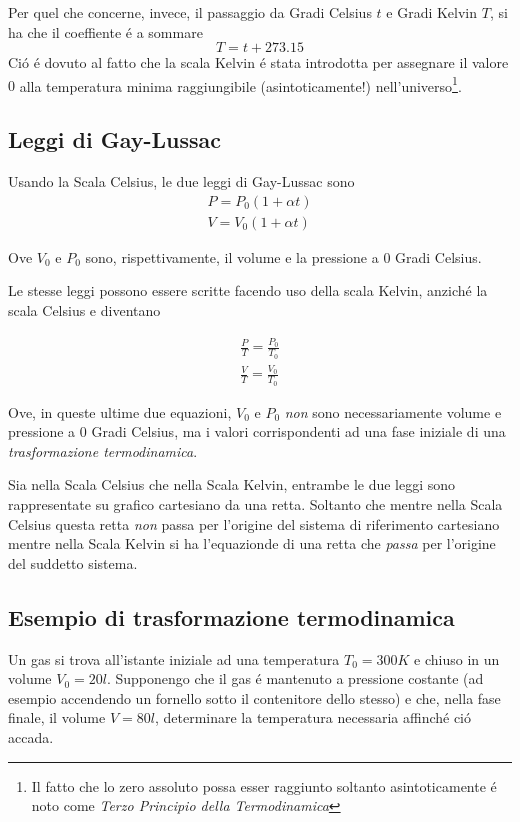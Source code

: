 \documentclass[17pt]{extarticle}
\begin{document}
Per quel che concerne, invece, il passaggio da Gradi Celsius $t$ e Gradi Kelvin $T$, si ha che il coeffiente \'e a sommare
$$
T = t + 273.15
$$ 
Ci\'o \'e dovuto al fatto che la scala Kelvin \'e stata introdotta per assegnare il valore $0$ alla temperatura minima raggiungibile (asintoticamente!) nell'universo\footnote{Il fatto che lo zero assoluto possa esser raggiunto soltanto asintoticamente \'e noto come \emph{Terzo Principio della Termodinamica}}.

\subsection{Leggi di Gay-Lussac}


Usando la Scala Celsius, le due leggi di Gay-Lussac sono
\begin{eqnarray}
	P = P_0\left( 1 + \alpha t \right)\\
	V = V_0\left( 1 + \alpha t \right)
\end{eqnarray}

Ove $V_0$ e $P_0$ sono, rispettivamente, il volume e la pressione a 0 Gradi Celsius.

Le stesse leggi possono essere scritte facendo uso della scala Kelvin, anzich\'e la scala Celsius e diventano

\begin{eqnarray}
	\frac{P}{T} = \frac{P_0}{T_0}\\ \label{eq:Gay_LussacV}
	\frac{V}{T} = \frac{V_0}{T_0}
\end{eqnarray}

Ove, in queste ultime due equazioni, $V_0$ e $P_0$ \emph{non} sono necessariamente volume e pressione a 0 Gradi Celsius, ma i valori corrispondenti ad una fase iniziale di una \emph{trasformazione termodinamica}. 

Sia nella Scala Celsius che nella Scala Kelvin, entrambe le due leggi sono rappresentate su grafico cartesiano da una retta. Soltanto che mentre nella Scala Celsius questa retta \emph{non} passa per l'origine del sistema di riferimento cartesiano mentre nella Scala Kelvin si ha l'equazionde di una retta che \emph{passa} per l'origine del suddetto sistema.

\subsection{Esempio di trasformazione termodinamica}

Un gas si trova all'istante iniziale ad una temperatura $T_0 = 300K$ e chiuso in un volume $V_0 = 20l$. Supponengo che il gas \'e mantenuto a pressione costante (ad esempio accendendo un fornello sotto il contenitore dello stesso) e che, nella fase finale, il volume $V = 80l$, determinare la temperatura necessaria affinch\'e ci\'o accada.
\end{document}
